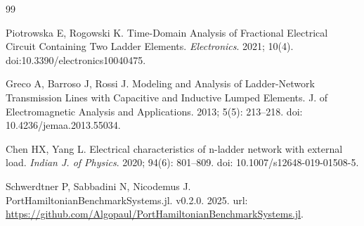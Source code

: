 \documentclass[a4paper, 10pt, twoside, twocolumn]{scrartcl}
\begin{document}
\begin{thebibliography}{99}
{		\raggedright
		Piotrowska E, Rogowski K.  Time-Domain Analysis of Fractional Electrical Circuit Containing Two Ladder Elements. {\itshape Electronics}. 2021; 10(4). doi:{10.3390/electronics10040475}.
		
		\raggedright
		Greco A, Barroso J, Rossi J. Modeling and Analysis of Ladder-Network Transmission Lines with Capacitive and Inductive Lumped Elements. {J. of Electromagnetic Analysis and Applications}. 2013; 5(5): 213--218. doi: 10.4236/jemaa.2013.55034. 
		
		\raggedright
		Chen HX, Yang L. Electrical characteristics of n-ladder network with external load. {\itshape Indian J. of Physics}. 2020; 94(6): 801--809. doi: {10.1007/s12648-019-01508-5}.
		
		\raggedright
		Schwerdtner P, Sabbadini N, Nicodemus J. PortHamiltonianBenchmarkSystems.jl. v0.2.0. 2025. url: {\url{https://github.com/Algopaul/PortHamiltonianBenchmarkSystems.jl}}.
		
		
	}
\end{thebibliography}
\end{document}
